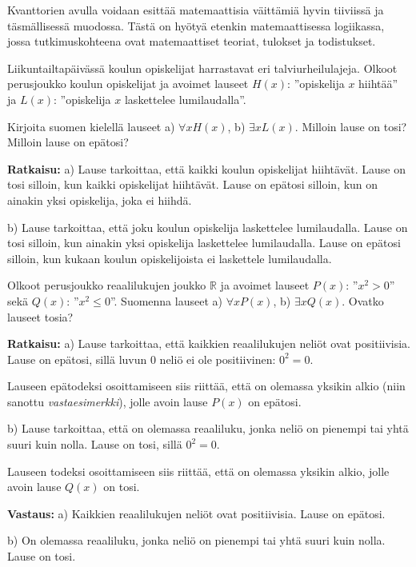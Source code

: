Kvanttorien avulla voidaan esittää matemaattisia väittämiä hyvin tiiviissä ja täsmällisessä muodossa. Tästä on hyötyä etenkin matemaattisessa logiikassa, jossa tutkimuskohteena ovat matemaattiset teoriat, tulokset ja todistukset. 

\begin{esimerkki}
Liikuntailtapäivässä koulun opiskelijat harrastavat eri talviurheilulajeja. Olkoot perusjoukko koulun opiskelijat ja avoimet lauseet $H(x)$: ''opiskelija $x$
 hiihtää'' ja $L(x)$: ''opiskelija $x$ laskettelee lumilaudalla''.

Kirjoita suomen kielellä lauseet a) $\forall x H(x)$,  b)  $\exists x L(x)$. Milloin lause on tosi? Milloin lause on epätosi?

{\bf Ratkaisu:} a) Lause tarkoittaa, että kaikki koulun opiskelijat hiihtävät. Lause on tosi silloin, kun
kaikki opiskelijat hiihtävät. Lause on epätosi silloin, kun on ainakin yksi opiskelija, joka ei 
hiihdä.  

b) Lause tarkoittaa, että joku koulun opiskelija laskettelee lumilaudalla. Lause on tosi
silloin, kun ainakin yksi opiskelija laskettelee lumilaudalla. Lause on epätosi silloin, kun 
kukaan koulun opiskelijoista ei laskettele lumilaudalla. 
\end{esimerkki}

\begin{esimerkki}
Olkoot perusjoukko reaalilukujen joukko $\mathbb{R}$ ja avoimet lauseet  $P(x)$: ''$x^2 > 0$''  sekä  
$Q(x)$: ''$x^2\le  0$''. Suomenna lauseet  a) $\forall x P(x)$,   b) $\exists x Q(x)$. Ovatko lauseet tosia?

{\bf Ratkaisu:}	a) Lause tarkoittaa, että kaikkien reaalilukujen neliöt ovat positiivisia. Lause on epätosi, sillä luvun $0$ neliö ei ole positiivinen: $0^2=0$.

Lauseen epätodeksi osoittamiseen siis riittää, että on olemassa yksikin alkio (niin sanottu {\em vastaesimerkki}), jolle avoin lause $P(x)$ on epätosi.

b)  Lause tarkoittaa, että on olemassa reaaliluku, jonka neliö on pienempi tai 
yhtä suuri kuin nolla. Lause on tosi, sillä $0^2 = 0$.

Lauseen todeksi osoittamiseen siis riittää, että on olemassa yksikin alkio, jolle avoin lause $Q(x)$ on tosi.

{\bf Vastaus:}	
a) Kaikkien reaalilukujen neliöt ovat positiivisia. Lause on epätosi.

b) On olemassa reaaliluku, jonka neliö on pienempi tai yhtä suuri kuin nolla. Lause on tosi. 
\end{esimerkki}

